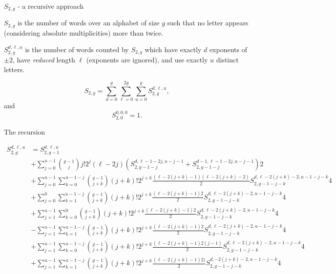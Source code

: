 \begin{frame}{$S_{2,g}$ - a recursive approach}

  \begin{definition}
    $S_{2,g}$ is the number of words over an alphabet of size $g$ such
    that no letter appears (considering absolute multiplicities) more
    than twice.
  \end{definition}

  \pause

  \begin{definition}
    $S_{2,g}^{d,\ell,u}$ is the number of words counted by $S_{2,g}$ which
    have exactly $d$ exponents of $\pm 2$, have \emph{reduced} length
    $\ell$ (exponents are ignored), and use exactly $u$ distinct letters.
  \end{definition}

  \pause

  \[S_{2,g} = \sum_{d=0}^{g} \sum_{\ell=0}^{2g} \sum_{u=0}^{g}
    S_{2,g}^{d,\ell,u}, \]
  and
  \[ S_{2,0}^{0,0,0} = 1. \]


\end{frame}

\begin{frame}{The recursion}

{\tiny
\[
\begin{aligned}
  S_{2,g}^{d,\ell,u}
  &= S_{2,g-1}^{d,\ell,u} \\
  &+\sum_{j=0}^{u-1} {g-1 \choose j}  j!  2^j  (\ell - 2j)  \left( S_{2,g-1-j}^{d, \ell-1-2j, u-j-1} + S_{2,g-1-j}^{d-1,\ell-1-2j,u-j-1} \right)  2 \\
  &+  \sum_{j=0}^{u-1} \sum_{k=0}^{u-1-j} { g-1 \choose j + k}  (j + k)!  2^{j + k}  \frac{(\ell - 2(j + k) - 1)  (\ell - 2 (j + k) - 2)}{2}  S_{2,g-1-j-k}^{d,\ell-2(j+k) - 2,u-1-j-k}  4 \\
  &+ \sum_{j=0}^{0} \sum_{k=1}^{u-1-j} { g-1 \choose j + k}  (j + k)!  2^{j + k}  \frac{(\ell - 2(j + k) - 1)  2}{2}  S_{2,g-1-j-k}^{d,\ell-2(j+k) - 2,u-1-j-k}  4 \\
  &+ \sum_{j=1}^{u-1} \sum_{k=0}^{0} { g-1 \choose j + k}  (j + k)!  2^{j + k}  \frac{(\ell - 2(j + k) - 1)  2}{2}  S_{2,g-1-j-k}^{d,\ell-2(j+k) - 2,u-1-j-k}  4 \\
  &- \sum_{j=1}^{u-1} \sum_{k=1}^{u-1-j} { g-1 \choose j + k}  (j + k)!  2^{j + k}  \frac{(\ell - 2(j + k) - 1)  2}{2}  S_{2,g-1-j-k}^{d,\ell-2(j+k) - 2,u-1-j-k}  4 \\
  &+ \sum_{j=1}^{u-1} \sum_{k=0}^{u-1-j} { g-1 \choose j + k}  (j + k)!  2^{j + k}  \frac{(\ell - 2(j + k) - 1)  2(j-1)}{2}  S_{2,g-1-j-k}^{d,\ell-2(j+k) - 2,u-1-j-k}  4\\
  &+ \sum_{j=1}^{u-1} \sum_{k=1}^{u-1-j} { g-1 \choose j + k}  (j + k)!  2^{j + k}  \frac{(\ell - 2(j + k) - 1)  2)}{2}  S_{2,g-1-j-k}^{d,-2(j+k) - 2,u-1-j-k}  4
\end{aligned}
\]
}
\end{frame}

